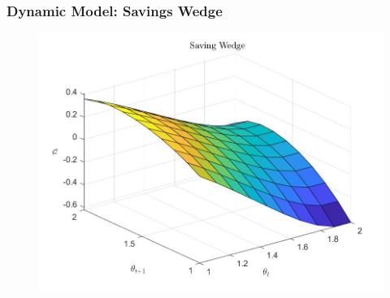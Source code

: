 \documentclass{beamer}
\begin{document}



\begin{frame}
    \frametitle{Dynamic Model: Savings Wedge}

    \begin{figure}[htbp]
        \centering
        \includegraphics[scale = 0.35]{figures/taub.jpg}
    \end{figure}

\end{frame}
\end{document}

